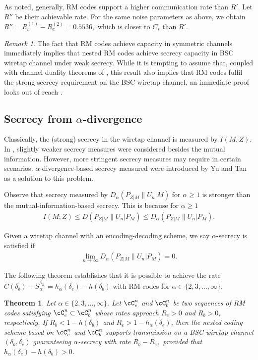 \documentclass{amsart}
\newtheorem{theorem}{Theorem}[section]
\theoremstyle{remark}
\newtheorem{remark}{Remark}
\begin{document}
As noted, generally, RM codes support a higher communication rate than $R'$. Let $R''$ be their achievable rate. For the same noise parameters as above, we obtain $R'' = R_b^{(1)} - R_e^{(2)} = 0.5536,$ which is closer to $C_s$ than $R'$.

\begin{remark}
The fact that RM codes achieve capacity in symmetric channels immediately implies that nested RM codes achieve secrecy 
capacity in BSC wiretap channel under weak secrecy. While it is tempting to assume that, 
coupled with channel duality theorems of \cite{Renes2018,Rengaswamy2021}, this result also implies that RM codes fulfil the strong secrecy requirement on the BSC wiretap channel, an immediate proof looks out of reach \cite{pfister2023private}.
\end{remark}

\subsection{Secrecy from \texorpdfstring{$\alpha$-}{}divergence}
Classically, the (strong) secrecy in the wiretap channel is measured by $I(M,Z)$. In \cite{bloch2013strong}, slightly weaker secrecy measures were considered besides the mutual information. However, more stringent secrecy measures may require in certain scenarios. $\alpha$-divergence-based secrecy measured were introduced by Yu and Tan \cite{yu2018renyi} as a solution to this problem.

Observe that secrecy measured by $D_{\alpha}(P_{Z|M}\|U_n|M)$ for $\alpha \geq 1$ is stronger than the mutual-information-based secrecy. This is because for $\alpha \geq 1$
\begin{align*}
    I(M;Z) \leq D(P_{Z|M}\|U_n|P_M) \leq D_{\alpha}(P_{Z|M}\|U_n|P_M).
\end{align*}

Given a wiretap channel with an encoding-decoding scheme, we say $\alpha$-secrecy is satisfied if 
\begin{align*}
    \lim_{n\to \infty } D_{\alpha}(P_{Z|M}\|U_n|P_M) = 0.
\end{align*}

The following theorem establishes that it is possible to achieve the rate $C(\delta_b)-S_{\alpha}^{\beta_{\delta_e}} = h_{\alpha}(\delta_e) - h(\delta_b)$ with RM codes for $\alpha \in \{2,3,\dots,\infty\}$.

\begin{theorem}
    Let $\alpha \in \{2,3,\dots,\infty\}$.
    Let $\cC_e^{n}$ and $\cC_b^{n}$ be two sequences of RM codes satisfying $\cC_e^{n}\subset\cC_b^{n}$ whose rates approach $R_e>0$  and $R_b>0,$ respectively. If $R_b <1-h(\delta_b)$ and $R_e > 1-h_{\alpha}(\delta_e)$, then the nested coding scheme based on $\cC_e^{n}$ and $\cC_b^{n}$ supports transmission on a BSC wiretap channel $(\delta_b,\delta_e)$ guaranteeing $\alpha$-secrecy with rate $R_b-R_e,$ provided that $h_{\alpha}(\delta_e) - h(\delta_b) > 0$.
\end{theorem}
\end{document}
